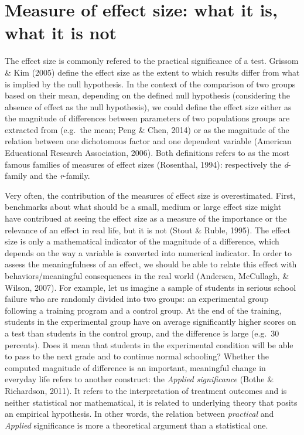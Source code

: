 \documentclass[
  man]{apa6}
\begin{document}
\hypertarget{measure-of-effect-size-what-it-is-what-it-is-not}{%
\section{Measure of effect size: what it is, what it is not}\label{measure-of-effect-size-what-it-is-what-it-is-not}}

The effect size is commonly refered to the practical significance of a test. Grissom \& Kim (2005) define the effect size as the extent to which results differ from what is implied by the null hypothesis. In the context of the comparison of two groups based on their mean, depending on the defined null hypothesis (considering the absence of effect as the null hypothesis), we could define the effect size either as the magnitude of differences between parameters of two populations groups are extracted from (e.g.~the mean; Peng \& Chen, 2014) or as the magnitude of the relation between one dichotomous factor and one dependent variable (American Educational Research Association, 2006). Both definitions refers to as the most famous families of measures of effect sizes (Rosenthal, 1994): respectively the \emph{d}-family and the \emph{r}-family.

Very often, the contribution of the measures of effect size is overestimated. First, benchmarks about what should be a small, medium or large effect size might have contribued at seeing the effect size as a measure of the importance or the relevance of an effect in real life, but it is not (Stout \& Ruble, 1995). The effect size is only a mathematical indicator of the magnitude of a difference, which depends on the way a variable is converted into numerical indicator. In order to assess the meaningfulness of an effect, we should be able to relate this effect with behaviors/meaningful consequences in the real world (Andersen, McCullagh, \& Wilson, 2007). For example, let us imagine a sample of students in serious school failure who are randomly divided into two groups: an experimental group following a training program and a control group. At the end of the training, students in the experimental group have on average significantly higher scores on a test than students in the control group, and the difference is large (e.g.~30 percents). Does it mean that students in the experimental condition will be able to pass to the next grade and to continue normal schooling? Whether the computed magnitude of difference is an important, meaningful change in everyday life refers to another construct: the \emph{Applied significance} (Bothe \& Richardson, 2011). It refers to the interpretation of treatment outcomes and is neither statistical nor mathematical, it is related to underlying theory that posits an empirical hypothesis. In other words, the relation between \emph{practical} and \emph{Applied} significance is more a theoretical argument than a statistical one.
\end{document}
